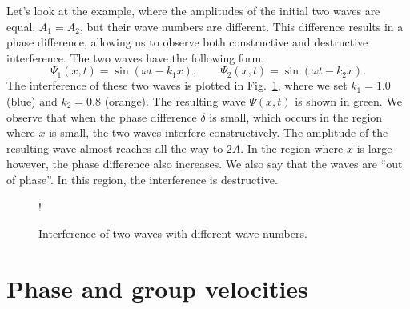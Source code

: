 Let's look at the example, where the amplitudes of the initial two waves are equal, $A_1=A_2$, but their wave numbers are different.
This difference results in a phase difference, allowing us to observe both constructive and destructive interference.
The two waves have the following form,
\begin{equation}
    \Psi_1(x,t) = \sin (\omega t - k_1x), \qquad \Psi_2(x,t) = \sin (\omega t - k_2 x).
\end{equation}
The interference of these two waves is plotted in Fig.~\ref{fig:interference_example}, where we set $k_1=1.0$ (blue) and $k_2=0.8$ (orange).
The resulting wave $\Psi(x,t)$ is shown in green.
We observe that when the phase difference $\delta$ is small, which occurs in the region where $x$ is small, the two waves interfere constructively.
The amplitude of the resulting wave almost reaches all the way to $2A$.
In the region where $x$ is large however, the phase difference also increases.
We also say that the waves are ``out of phase''.
In this region, the interference is destructive.
\begin{figure}[t]
    \centering
    \resizebox {0.6\textwidth} {!} {
    }
    \caption[Superposition of two waves.]{Interference of two waves with different wave numbers.}
    \label{fig:interference_example}    
\end{figure}


\section{Phase and group velocities}
\label{sec:6-2_phase_group_velocity}

